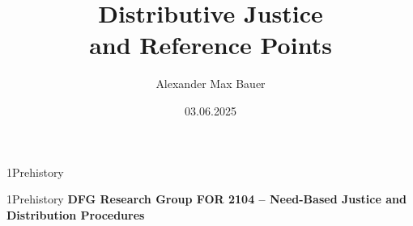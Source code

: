 \documentclass[xcolor=table,9pt,aspectratio=169]{beamer}
\title{Distributive Justice\\and Reference Points}
\subtitle{}
\author{Alexander Max Bauer}
\date{03.06.2025}
\begin{document}
{
\begin{frame}
   \maketitle
\end{frame}
}


\begin{frame}
   \begin{overlayarea}{\textwidth}{0.81\paperheight}{
      \vspace*{11mm}
      \textcolor{uolblue}
      {1\hspace*{1em}Prehistory}
   }
   \end{overlayarea}
\end{frame}


\begin{frame}{\vspace*{10mm}1\hspace*{1em}Prehistory}
   \textbf{DFG Research Group FOR 2104 -- Need-Based Justice and Distribution Procedures}
   \begin{center}
   \end{center}
\end{frame}
\end{document}
